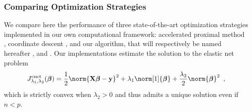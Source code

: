  
\subsubsection{Comparing Optimization Strategies} 

We compare here the performance of three state-of-the-art optimization
strategies implemented in our own computational framework:
accelerated proximal method \citep[see, e.g.,][]{2009_SIAM_Beck},
coordinate descent \citep[popularized by][]{2007_AAS_Friedman},
and our algorithm, that will respectively be named hereafter ,
 and .
Our implementations estimate the solution to the elastic net problem
\begin{equation}
  \label{eq:enet}
    J_{\lambda_1,
    \lambda_2}^{\text{enet}}(\boldsymbol\beta)= \frac{1}{2}
  \norm{\mathbf{X}\boldsymbol\beta - \mathbf{y}}^2 +
  \lambda_1 \norm[1]{\boldsymbol\beta} + \frac{\lambda_2}{2} \norm{\boldsymbol\beta}^2
  \enspace,
\end{equation}
which is strictly convex when $\lambda_2>0$ and thus admits a unique
solution even if $n<p$.

